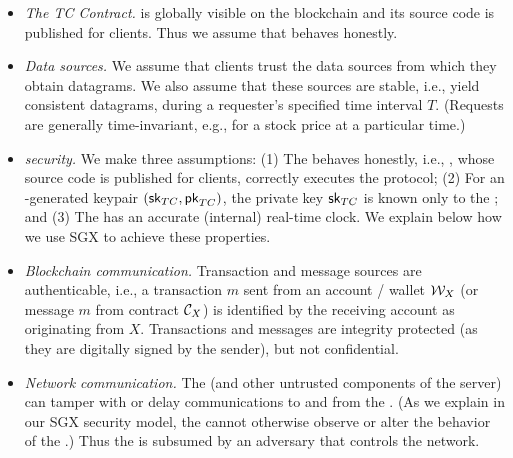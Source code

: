 \begin{itemize}
  \setlength{\itemsep}{2pt}
  \setlength{\parskip}{0pt}
  \setlength{\parsep}{0pt}

\item {\em The TC Contract.} \tcont is globally visible on the blockchain and its source code is published for clients. Thus we assume that \tcont behaves honestly.

\item {\em Data sources.} We assume that clients trust the data sources from which they obtain \tc datagrams. We also assume that these sources are stable, i.e., yield consistent datagrams, during a requester's specified time interval $T$. (Requests are generally time-invariant, e.g., for a stock price at a particular time.)

\item {\em \encname security.} We make three assumptions: (1) The \encname behaves honestly, i.e., \engine, whose source code is published for clients, correctly executes the \tc protocol; (2) For an \encname-generated keypair $({\sf sk}_{TC}, {\sf pk}_{TC})$, the private key ${\sf sk}_{TC}$ is known only to the \encname; and (3) The \encname has an accurate (internal) real-time clock. We explain below how we use SGX to achieve these properties. 


\item {\em Blockchain communication.} Transaction and message sources are authenticable, i.e., a transaction $m$ sent from an account / wallet ${\cal W}_{X}$ (or message $m$ from contract ${\cal C}_{X}$) is identified by the receiving account as originating from $X$. Transactions and messages are integrity protected (as they are digitally signed by the sender), but not confidential. 

\item {\em Network communication.} The \medname (and other untrusted components of the \tc server) can tamper with or delay communications to and from the \encname. (As we explain in our SGX security model, the \medname cannot otherwise observe or alter the behavior of the \encname.) Thus the \medname is subsumed by an adversary that controls the network. 

\end{itemize}












